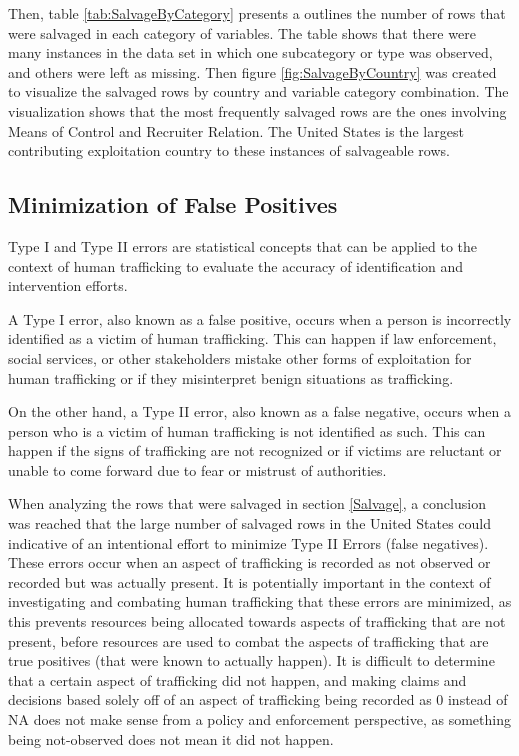 \documentclass{article} %
\begin{document}
	Then, table \ref{tab:SalvageByCategory} presents a outlines the number of rows that were salvaged in each category of variables. The table shows that there were many instances in the data set in which one subcategory or type was observed, and others were left as missing. Then figure \ref{fig:SalvageByCountry} was created to visualize the salvaged rows by country and variable category combination. The visualization shows that the most frequently salvaged rows are the ones involving Means of Control and Recruiter Relation. The United States is the largest contributing exploitation country to these instances of salvageable rows.
	
	
	
	\subsection{Minimization of False Positives}
	
	Type I and Type II errors are statistical concepts that can be applied to the context of human trafficking to evaluate the accuracy of identification and intervention efforts.
	
	A Type I error, also known as a false positive, occurs when a person is incorrectly identified as a victim of human trafficking. This can happen if law enforcement, social services, or other stakeholders mistake other forms of exploitation for human trafficking or if they misinterpret benign situations as trafficking.
	
	On the other hand, a Type II error, also known as a false negative, occurs when a person who is a victim of human trafficking is not identified as such. This can happen if the signs of trafficking are not recognized or if victims are reluctant or unable to come forward due to fear or mistrust of authorities.
	
	When analyzing the rows that were salvaged in section \ref{Salvage}, a conclusion was reached that the large number of salvaged rows in the United States could indicative of an intentional effort to minimize Type II Errors (false negatives). These errors occur when an aspect of trafficking is recorded as not observed or recorded but was actually present. It is potentially important in the context of investigating and combating human trafficking that these errors are minimized, as this prevents resources being allocated towards aspects of trafficking that are not present, before resources are used to combat the aspects of trafficking that are true positives (that were known to actually happen). It is difficult to determine that a certain aspect of trafficking did not happen, and making claims and decisions based solely off of an aspect of trafficking being recorded as 0 instead of NA does not make sense from a policy and enforcement perspective, as something being not-observed does not mean it did not happen. 
	
\end{document}
